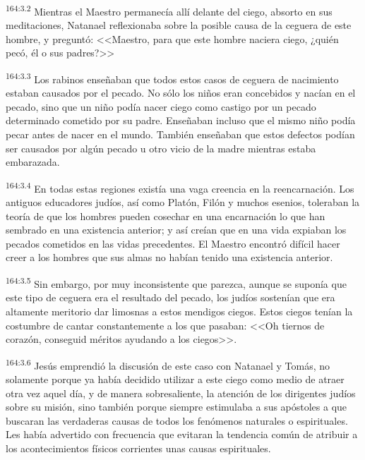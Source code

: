 \par 
\textsuperscript{164:3.2} Mientras el Maestro permanecía allí delante del ciego, absorto en sus meditaciones, Natanael reflexionaba sobre la posible causa de la ceguera de este hombre, y preguntó: <<Maestro, para que este hombre naciera ciego, ¿quién pecó, él o sus padres?>>

\par 
\textsuperscript{164:3.3} Los rabinos enseñaban que todos estos casos de ceguera de nacimiento estaban causados por el pecado. No sólo los niños eran concebidos y nacían en el pecado, sino que un niño podía nacer ciego como castigo por un pecado determinado cometido por su padre. Enseñaban incluso que el mismo niño podía pecar antes de nacer en el mundo. También enseñaban que estos defectos podían ser causados por algún pecado u otro vicio de la madre mientras estaba embarazada.

\par 
\textsuperscript{164:3.4} En todas estas regiones existía una vaga creencia en la reencarnación. Los antiguos educadores judíos, así como Platón, Filón y muchos esenios, toleraban la teoría de que los hombres pueden cosechar en una encarnación lo que han sembrado en una existencia anterior; y así creían que en una vida expiaban los pecados cometidos en las vidas precedentes. El Maestro encontró difícil hacer creer a los hombres que sus almas no habían tenido una existencia anterior.

\par 
\textsuperscript{164:3.5} Sin embargo, por muy inconsistente que parezca, aunque se suponía que este tipo de ceguera era el resultado del pecado, los judíos sostenían que era altamente meritorio dar limosnas a estos mendigos ciegos. Estos ciegos tenían la costumbre de cantar constantemente a los que pasaban: <<Oh tiernos de corazón, conseguid méritos ayudando a los ciegos>>.

\par 
\textsuperscript{164:3.6} Jesús emprendió la discusión de este caso con Natanael y Tomás, no solamente porque ya había decidido utilizar a este ciego como medio de atraer otra vez aquel día, y de manera sobresaliente, la atención de los dirigentes judíos sobre su misión, sino también porque siempre estimulaba a sus apóstoles a que buscaran las verdaderas causas de todos los fenómenos naturales o espirituales. Les había advertido con frecuencia que evitaran la tendencia común de atribuir a los acontecimientos físicos corrientes unas causas espirituales.


